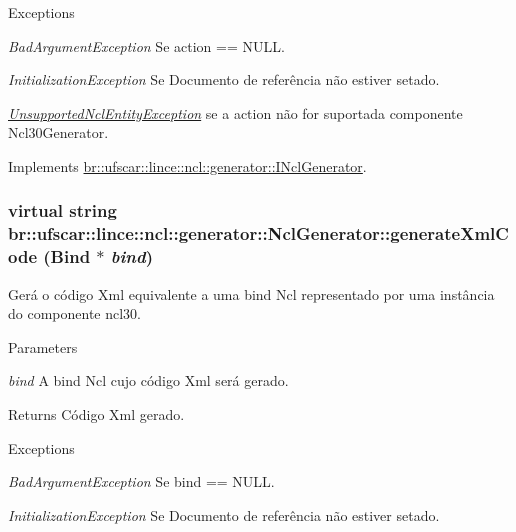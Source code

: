\begin{DoxyExceptions}{Exceptions}
\item[{\em BadArgumentException}]Se action == NULL. \item[{\em InitializationException}]Se Documento de referência não estiver setado. \item[{\em \hyperlink{classbr_1_1ufscar_1_1lince_1_1ncl_1_1generator_1_1UnsupportedNclEntityException}{UnsupportedNclEntityException}}]se a action não for suportada componente Ncl30Generator. \end{DoxyExceptions}


Implements \hyperlink{classbr_1_1ufscar_1_1lince_1_1ncl_1_1generator_1_1INclGenerator_a6a5fcbb5969d970eef4e5ea8826c84c6}{br::ufscar::lince::ncl::generator::INclGenerator}.

\hypertarget{classbr_1_1ufscar_1_1lince_1_1ncl_1_1generator_1_1NclGenerator_abd146c724f44d5750a92979d8fe53b34}{
\subsubsection[{generateXmlCode}]{\setlength{\rightskip}{0pt plus 5cm}virtual string br::ufscar::lince::ncl::generator::NclGenerator::generateXmlCode (Bind $\ast$ {\em bind})}}
\label{classbr_1_1ufscar_1_1lince_1_1ncl_1_1generator_1_1NclGenerator_abd146c724f44d5750a92979d8fe53b34}


Gerá o código Xml equivalente a uma bind Ncl representado por uma instância do componente ncl30. 


\begin{DoxyParams}{Parameters}
\item[{\em bind}]A bind Ncl cujo código Xml será gerado. \end{DoxyParams}
\begin{DoxyReturn}{Returns}
Código Xml gerado. 
\end{DoxyReturn}

\begin{DoxyExceptions}{Exceptions}
\item[{\em BadArgumentException}]Se bind == NULL. \item[{\em InitializationException}]Se Documento de referência não estiver setado. \end{DoxyExceptions}


